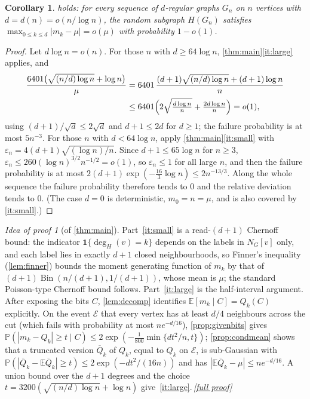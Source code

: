 \documentclass[11pt,a4paper]{article}
\theoremstyle{plain}
\newtheorem{corollary}[theorem]{Corollary}
\theoremstyle{definition}
\theoremstyle{remark}
\newtheorem*{proofidea}{Idea of proof}
\newcommand{\fullproofref}[1]{\,\hyperref[#1]{\textit{[full proof]}}}
\newcommand{\EE}{\mathbb E}
\newcommand{\PP}{\mathbb P}
\newcommand{\ind}{\mathbf 1}
\newcommand{\Bin}{\operatorname{Bin}}
\newcommand{\cE}{\mathcal E}
\newcommand{\degH}{\deg_H}
\newcommand{\Qbar}{\overline Q}
\begin{document}
\begin{corollary}\label{cor:flp}
 holds: for every sequence of $d$-regular graphs $G_n$ on $n$ vertices with $d=d(n)=o(n/\log n)$, the random subgraph $H(G_n)$ satisfies $\max_{0\le k\le d}|m_k-\mu|=o(\mu)$ with probability $1-o(1)$.
\end{corollary}
\begin{proof}
Let $d\log n=o(n)$. For those $n$ with $d\ge64\log n$, \cref{thm:main}\ref{it:large} applies, and
\begin{align*}
 \frac{6401\bigl(\sqrt{(n/d)\log n}+\log n\bigr)}{\mu}
 &=6401\,\frac{(d+1)\sqrt{(n/d)\log n}+(d+1)\log n}{n}\\
 &\le 6401\Bigl(2\sqrt{\tfrac{d\log n}{n}}+\tfrac{2d\log n}{n}\Bigr)=o(1),
\end{align*}
using $(d+1)/\sqrt d\le2\sqrt d$ and $d+1\le 2d$ for $d\ge1$; the failure probability is at most $5n^{-3}$. For those $n$ with $d<64\log n$, apply \cref{thm:main}\ref{it:small} with $\varepsilon_n=4(d+1)\sqrt{(\log n)/n}$. Since $d+1\le65\log n$ for $n\ge3$, $\varepsilon_n\le260(\log n)^{3/2}n^{-1/2}=o(1)$, so $\varepsilon_n\le1$ for all large $n$, and then the failure probability is at most $2(d+1)\exp(-\tfrac{16}3\log n)\le 2n^{-13/3}$. Along the whole sequence the failure probability therefore tends to $0$ and the relative deviation tends to $0$. (The case $d=0$ is deterministic, $m_0=n=\mu$, and is also covered by \ref{it:small}.)
\end{proof}

\begin{proofidea}[of \cref{thm:main}]
Part~\ref{it:small} is a read-$(d+1)$ Chernoff bound: the indicator $\ind\{\degH(v)=k\}$ depends on the labels in $N_G[v]$ only, and each label lies in exactly $d+1$ closed neighbourhoods, so Finner's inequality (\cref{lem:finner}) bounds the moment generating function of $m_k$ by that of $(d+1)\Bin(n/(d+1),1/(d+1))$, whose mean is $\mu$; the standard Poisson-type Chernoff bound follows. Part~\ref{it:large} is the half-interval argument. After exposing the bits $C$, \cref{lem:decomp} identifies $\EE[m_k\mid C]=Q_k(C)$ explicitly. On the event $\cE$ that every vertex has at least $d/4$ neighbours across the cut (which fails with probability at most $ne^{-d/16}$), \cref{prop:givenbits} gives $\PP(|m_k-Q_k|\ge t\mid C)\le2\exp(-\tfrac1{800}\min\{dt^2/n,t\})$; \cref{prop:condmean} shows that a truncated version $\Qbar_k$ of $Q_k$, equal to $Q_k$ on $\cE$, is sub-Gaussian with $\PP(|\Qbar_k-\EE\Qbar_k|\ge t)\le2\exp(-dt^2/(16n))$ and has $|\EE\Qbar_k-\mu|\le ne^{-d/16}$. A union bound over the $d+1$ degrees and the choice $t=3200(\sqrt{(n/d)\log n}+\log n)$ give~\ref{it:large}.\fullproofref{pf:main}
\end{proofidea}
\end{document}
